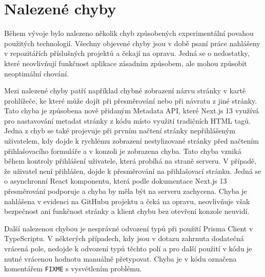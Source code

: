 \section{Nalezené chyby}

Během vývoje bylo nalezeno několik chyb způsobených experimentální povahou použitých technologií. Všechny objevené chyby jsou v době psaní práce
nahlášeny v repozitářích příslušných projektů a čekají na opravu. Jedná se o nedostatky, které neovlivňují funkčnost aplikace zásadním způsobem, ale mohou způsobit
neoptimální chování.

Mezi nalezené chyby patří například chybné zobrazení názvu stránky v kartě prohlížeče, ke které může dojít při přesměrování nebo při 
návratu z jiné stránky. Tato chyba je způsobena nově přidaným Metadata API, které Next.js 13 využívá pro nastavování metadat stránky z kódu místo využití tradičních
HTML tagů. Jedna z chyb se také projevuje při prvním načtení stránky nepřihlášeným uživatelem, kdy dojde k rychlému zobrazení nestylizované stránky před načtením
přihlašovacího formuláře a v konzoli je zobrazena chyba. Tato chyba vzniká během kontroly přihlášení uživatele, která probíhá na straně serveru. V případě, že 
uživatel není přihlášen, dojde k přesměrování na přihlašovací stránku. Jedná se o asynchronní React komponentu, která podle dokumentace Next.js 13 přesměrování podporuje a chyba by 
měla být na serveru zachycena. Chyba je nahlášena v evidenci na GitHubu projektu a čeká na opravu, neovlivňuje však bezpečnost ani funkčnost stránky a klient
chybu bez otevření konzole neuvidí.

Další nalezenou chybou je nesprávné odvození typů při použití Prisma Client v TypeScriptu. V některých případech, kdy jsou v dotazu zahrnuta dodatečná vrácená pole, nedojde
k odvození typů těchto polí a pro další použití v kódu je nutné vrácenou hodnotu manuálně přetypovat. Chyba je v kódu označena komentářem \texttt{FIXME} s vysvětlením problému.
